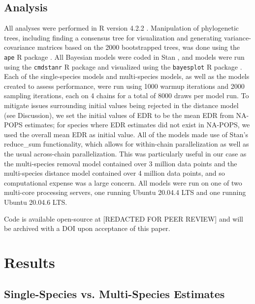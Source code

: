\documentclass[12pt]{article}
\begin{document}
\subsection{Analysis}
\par All analyses were performed in R version 4.2.2 \citep{r_core_team_r_2022}.
Manipulation of phylogenetic trees, including finding a consensus tree for visualization and generating variance-covariance matrices based on the 2000 bootstrapped trees, was done using the \texttt{ape} R package \citep{paradis_ape_2019}.
All Bayesian models were coded in Stan \cite{stan_development_team_stan_2024}, and models were run using the \texttt{cmdstanr} R package \citep{gabry_cmdstanr_2023} and visualized using the \texttt{bayesplot} R package \citep{gabry_visualization_2019}.
Each of the single-species models and multi-species models, as well as the models created to assess performance, were run using 1000 warmup iterations and 2000 sampling iterations, each on 4 chains for a total of 8000 draws per model run.
To mitigate issues surrounding initial values being rejected in the distance model (see Discussion), we set the initial values of EDR to be the mean EDR from NA-POPS \citep{edwards_point_2023} estimates; for species where EDR estimates did not exist in NA-POPS, we used the overall mean EDR as initial value.
All of the models made use of Stan's reduce\_sum functionality, which allows for within-chain parallelization as well as the usual across-chain parallelization.
This was particularly useful in our case as the multi-species removal model contained over 3 million data points and the multi-species distance model contained over 4 million data points, and so computational expense was a large concern.
All models were run on one of two multi-core processing servers, one running Ubuntu 20.04.4 LTS and one running Ubuntu 20.04.6 LTS.

\par Code is available open-source at [REDACTED FOR PEER REVIEW] and will be archived with a DOI upon acceptance of this paper.


\section{Results}

\subsection{Single-Species vs. Multi-Species Estimates}
\end{document}
